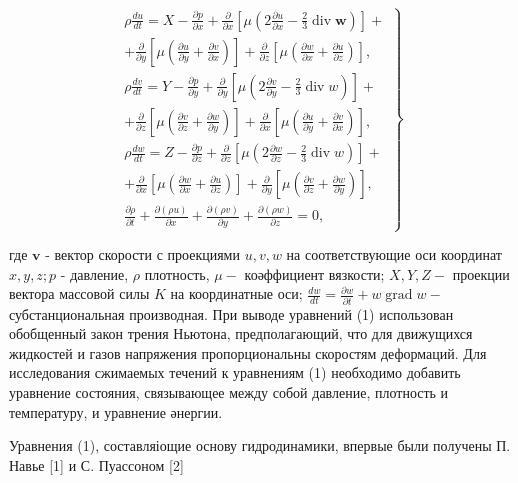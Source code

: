 \documentclass[10pt]{article}
\begin{document}
\[

\left.\begin{array}{c}

\rho \frac{d u}{d t}=X-\frac{\partial p}{\partial x}+\frac{\partial}{\partial x}\left[\mu\left(2 \frac{\partial u}{\partial x}-\frac{2}{3} \operatorname{div} \boldsymbol{w}\right)\right]+ \\

+\frac{\partial}{\partial y}\left[\mu\left(\frac{\partial u}{\partial y}+\frac{\partial v}{\partial x}\right)\right]+\frac{\partial}{\partial z}\left[\mu\left(\frac{\partial w}{\partial x}+\frac{\partial u}{\partial z}\right)\right], \\

\rho \frac{d v}{d t}=Y-\frac{\partial p}{\partial y}+\frac{\partial}{\partial y}\left[\mu\left(2 \frac{\partial v}{\partial y}-\frac{2}{3} \operatorname{div} w\right)\right]+ \\

+\frac{\partial}{\partial z}\left[\mu\left(\frac{\partial v}{\partial z}+\frac{\partial w}{\partial y}\right)\right]+\frac{\partial}{\partial x}\left[\mu\left(\frac{\partial u}{\partial y}+\frac{\partial v}{\partial x}\right)\right], \\

\rho \frac{d w}{d t}=Z-\frac{\partial p}{\partial z}+\frac{\partial}{\partial z}\left[\mu\left(2 \frac{\partial w}{\partial z}-\frac{2}{3} \operatorname{div} w\right)\right]+ \\

+\frac{\partial}{\partial x}\left[\mu\left(\frac{\partial w}{\partial x}+\frac{\partial u}{\partial z}\right)\right]+\frac{\partial}{\partial y}\left[\mu\left(\frac{\partial v}{\partial z}+\frac{\partial w}{\partial y}\right)\right], \\

\frac{\partial \rho}{\partial t}+\frac{\partial(\rho u)}{\partial x}+\frac{\partial(\rho v)}{\partial y}+\frac{\partial(\rho w)}{\partial z}=0,

\end{array}\right\}

\]



где $\boldsymbol{v}$ - вектор скорости с проекциями $u, v, w$ на соответствующие оси координат $x, y, z ; p$ - давление, $\rho$ плотность, $\mu-$ коәффициент вязкости; $X, Y, Z-$ проекции вектора массовой силы $K$ на координатные оси; $\frac{d w}{d t}=\frac{\partial w}{\partial t}+w \operatorname{grad} w-$ субстанциональная производная. При выводе уравнений (1) использован обобщенный закон трения Ньютона, предполагающий, что для движущихся жидкостей и газов напряжения пропорциональны скоростям деформаций. Для исследования сжимаемых течений к уравнениям (1) необходимо добавить уравнение состояния, связывающее между собой давление, плотность и температуру, и уравнение әнергии.



Уравнения (1), составляіощие основу гидродинамики, впервые были получены П. Навье [1] и С. Пуассоном [2]
\end{document}

